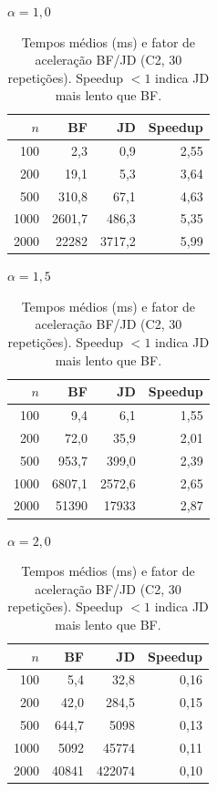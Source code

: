\documentclass{infufrgs}
\begin{document}
\begin{table}[H]
\centering
\caption{Tempos médios (ms) e fator de aceleração BF/JD (C2, 30 repetições). Speedup $< 1$ indica JD mais lento que BF.}
\label{tab:c2-scalability}
\footnotesize
\begin{minipage}[t]{0.30\linewidth}
\centering
\textit{$\alpha = 1{,}0$}\\[3pt]
\begin{tabular}{rrrr}
\toprule
$n$ & BF & JD & Speedup \\
\midrule
100  &    2{,}3  &    0{,}9 &  2{,}55 \\
200  &   19{,}1  &    5{,}3 &  3{,}64 \\
500  &  310{,}8  &   67{,}1 &  4{,}63 \\
1000 & 2601{,}7  &  486{,}3 &  5{,}35 \\
2000 & 22282     & 3717{,}2 &  5{,}99 \\
\bottomrule
\end{tabular}
\end{minipage}\hfill
\begin{minipage}[t]{0.30\linewidth}
\centering
\textit{$\alpha = 1{,}5$}\\[3pt]
\begin{tabular}{rrrr}
\toprule
$n$ & BF & JD & Speedup \\
\midrule
100  &    9{,}4 &    6{,}1 &  1{,}55 \\
200  &   72{,}0 &   35{,}9 &  2{,}01 \\
500  &  953{,}7 &  399{,}0 &  2{,}39 \\
1000 & 6807{,}1 & 2572{,}6 &  2{,}65 \\
2000 & 51390    & 17933    &  2{,}87 \\
\bottomrule
\end{tabular}
\end{minipage}\hfill
\begin{minipage}[t]{0.30\linewidth}
\centering
\textit{$\alpha = 2{,}0$}\\[3pt]
\begin{tabular}{rrrr}
\toprule
$n$ & BF & JD & Speedup \\
\midrule
100  &    5{,}4 &    32{,}8 &  0{,}16 \\
200  &   42{,}0 &   284{,}5 &  0{,}15 \\
500  &  644{,}7 &  5098     &  0{,}13 \\
1000 & 5092     & 45774     &  0{,}11 \\
2000 & 40841    & 422074    &  0{,}10 \\
\bottomrule
\end{tabular}
\end{minipage}
\end{table}
\end{document}
